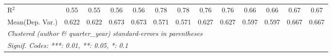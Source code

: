 \begin{tabular}{lcccccccccccc}
   R$^2$                                    & 0.55         & 0.55          & 0.56    & 0.56         & 0.78         & 0.78    & 0.76          & 0.76    & 0.66          & 0.66    & 0.67    & 0.67\\  
Mean(Dep. Var.) & 0.622 & 0.622 & 0.673 & 0.673 & 0.571 & 0.571 & 0.627 & 0.627 & 0.597 & 0.597 & 0.667 & 0.667 \\
   \midrule \midrule
   \multicolumn{13}{l}{\emph{Clustered (author \& quarter\_year) standard-errors in parentheses}}\\
   \multicolumn{13}{l}{\emph{Signif. Codes: ***: 0.01, **: 0.05, *: 0.1}}\\
\end{tabular}
\par\endgroup
